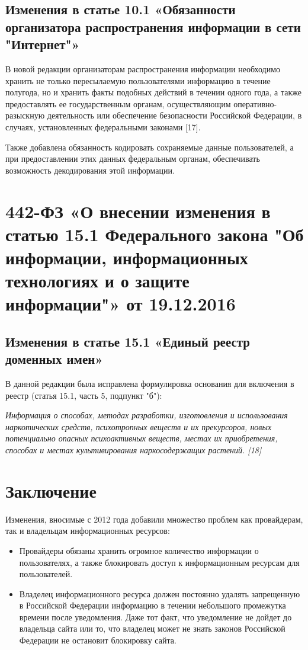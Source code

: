 \documentclass[14pt,a4paper,report]{article}
\begin{document}
\subsection{Изменения в статье 10.1 «Обязанности организатора распространения информации в сети "Интернет"»}

В новой редакции организаторам распространения информации необходимо хранить не только пересылаемую пользователями информацию в течение полугода, но и хранить факты подобных действий в течении одного года, а также предоставлять ее государственным органам, осуществляющим оперативно-разыскную деятельность
или обеспечение безопасности Российской Федерации, в случаях, установленных федеральными законами [17].

Также добавлена обязанность кодировать сохраняемые данные пользователей, а при предоставлении этих данных федеральным органам, обеспечивать возможность декодирования этой информации.

\section{442-ФЗ «О внесении изменения в статью 15.1 Федерального закона "Об информации, информационных технологиях и о защите информации"» от 19.12.2016}	

\subsection{Изменения в статье 15.1 «Единый реестр доменных имен»}

В данной редакции была исправлена формулировка основания для включения в реестр (статья 15.1, часть 5, подпункт "б"):

\begin{displayquote}
	\emph{Информация о способах, методах разработки, изготовления и использования наркотических средств, психотропных веществ и их прекурсоров, новых потенциально опасных психоактивных веществ, местах их приобретения, способах и местах культивирования наркосодержащих растений. [18]}
\end{displayquote}
	
\section{Заключение}

Изменения, вносимые с 2012 года добавили множество проблем как провайдерам, так и владельцам информационных ресурсов:

\begin{itemize}
	\item Провайдеры обязаны хранить огромное количество информации о пользователях, а также блокировать доступ к информационным ресурсам для пользователей. 
	\item Владелец информационного ресурса должен постоянно удалять запрещенную в Российской Федерации информацию в течении небольшого промежутка времени после уведомления. Даже тот факт, что уведомление не дойдет до владельца сайта или то, что владелец может не знать законов Российской Федерации не остановит блокировку сайта.
\end{itemize}
\end{document}
